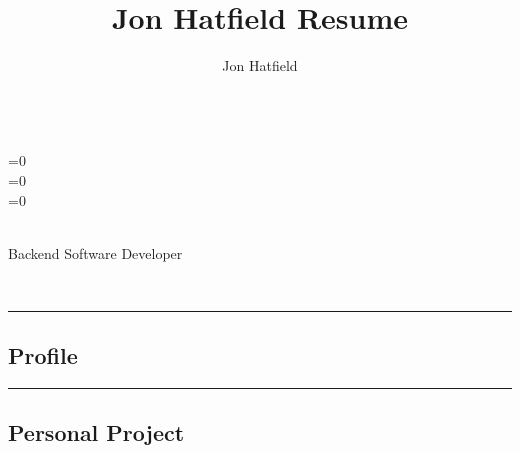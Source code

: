 \documentclass[10pt,letterpaper]{article}
\author{Jon Hatfield}
\title{Jon Hatfield Resume}
\begin{document}
\begin{center}
    {\huge \textbf{}}
    \\
    \ifnum{}=0
         \ \textbullet \ \ 
        \\
    \fi
    \ifnum{}=0
         \ \textbullet \ \ 
        \\
    \fi
    \ifnum{}=0
        \ \textbullet \ \ %
        \\
    \fi

    \\
    {\large Backend Software Developer \ \ \textbullet \ \ }
\end{center}

\begin{center}
    {\large
    
    \\}
\end{center}

\hrule
\vspace{-0.4em}
\subsection*{Profile}




\hrule
\vspace{-0.4em}
\subsection*{Personal Project}

\begin{itemize}

    \begin{samepage}
    \item
        
    \end{samepage}
\end{itemize}
\end{document}
